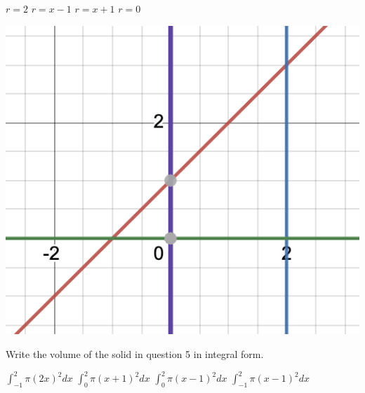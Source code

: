 \documentclass[addpoints, 12pt]{exam}%
\newcommand{\spc}{\vspace*{0.5cm}}
\begin{document}
\begin{questions}
\begin{minipage}{0.5\textwidth}
\begin{choices}
\choice $r = 2$ \vspace*{10pt}
\choice $r = x - 1$\vspace*{10pt}
\CorrectChoice $r = x + 1$ \vspace*{10pt}
\choice $r = 0$ \vspace*{10pt}
\end{choices}
\end{minipage}
\hspace*{1cm}
\begin{minipage}{0.35\textwidth}
\includegraphics[width=1\textwidth]{HW15graph2.png}
\end{minipage}

\spc

\question[1]

Write the volume of the solid in question 5 in integral form.

\begin{multicols}{2}
\begin{choices}
\choice $\int_{-1}^{2} \pi(2x)^2dx$
\CorrectChoice $\int_{0}^{2} \pi(x+1)^2dx$
\choice $\int_{0}^{2} \pi(x-1)^2dx$
\choice $\int_{-1}^{2} \pi(x-1)^2dx$
\end{choices}
\end{multicols}

\spc

\question[1]


\end{questions}
\end{document}
